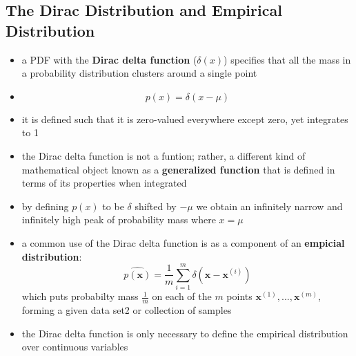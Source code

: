 \documentclass[11pt, twocolumn]{report}
\begin{document}
\subsection{The Dirac Distribution and Empirical Distribution}
\begin{itemize}
  \item a PDF with the \textbf{Dirac delta function} ($\delta(x)$) specifies
    that all the mass in a probability distribution clusters around a single
    point
  \item
    \begin{equation}
      p(x) = \delta(x - \mu)
    \end{equation}
  \item it is defined such that it is zero-valued everywhere except zero, yet
    integrates to 1
  \item the Dirac delta function is not a funtion; rather, a different kind of
    mathematical object known as a \textbf{generalized function} that is
    defined in terms of its properties when integrated
  \item by defining $p(x)$ to be $\delta$ shifted by $-\mu$ we obtain an
    infinitely narrow and infinitely high peak of probability mass where $x =
    \mu$
  \item a common use of the Dirac delta function is as a component of an
    \textbf{empicial distribution}:
    \begin{equation}
      \hat{p(\bm{x})} = \frac{1}{m} \sum_{i=1}^m \delta (\bm{x} - \bm{x}^{(i)})
    \end{equation}
    which puts probabilty mass $\frac{1}{m}$ on each of the $m$ points
    $\bm{x}^{(1)},...,\bm{x}^{(m)}$, forming a given data set2 or collection of
    samples
  \item the Dirac delta function is only necessary to define the empirical
    distribution over continuous variables
\end{itemize}
\end{document}

